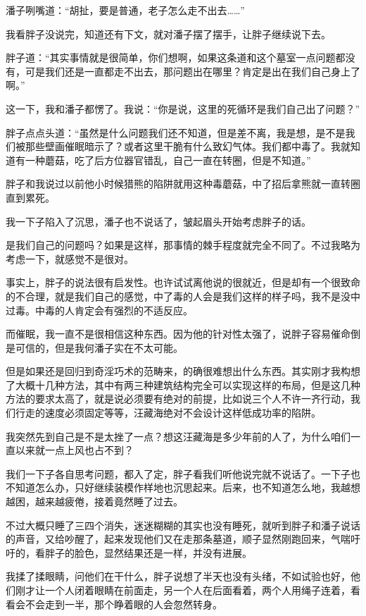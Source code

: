 潘子咧嘴道：“胡扯，要是普通，老子怎么走不出去……”

我看胖子没说完，知道还有下文，就对潘子摆了摆手，让胖子继续说下去。

胖子道：“其实事情就是很简单，你们想啊，如果这条道和这个墓室一点问题都没有，可是我们还是一直都走不出去，那问题出在哪里？肯定是出在我们自己身上了啊。”

这一下，我和潘子都愣了。我说：“你是说，这里的死循环是我们自己出了问题？”

胖子点点头道：“虽然是什么问题我们还不知道，但是差不离，我是想，是不是我们被那些壁画催眠暗示了？或者这里干脆有什么致幻气体。我们都中毒了。我就知道有一种蘑菇，吃了后方位器官错乱，自己一直在转圈，但是不知道。”

胖子和我说过以前他小时候猎熊的陷阱就用这种毒蘑菇，中了招后拿熊就一直转圈直到累死。

我一下子陷入了沉思，潘子也不说话了，皱起眉头开始考虑胖子的话。

是我们自己的问题吗？如果是这样，那事情的棘手程度就完全不同了。不过我略为考虑一下，就感觉不是很对。

事实上，胖子的说法很有启发性。也许试试离他说的很就近，但是却有一个很致命的不合理，就是我们自己的感觉，中了毒的人会是我们这样的样子吗，我不是没中过毒。中毒的人肯定会有强烈的不适反应。

而催眠，我一直不是很相信这种东西。因为他的针对性太强了，说胖子容易催命倒是可信的，但是我何潘子实在不太可能。

但是如果还是回归到奇淫巧术的范畴来，的确很难想出什么东西。其实刚才我构想了大概十几种方法，其中有两三种建筑结构完全可以实现这样的布局，但是这几种方法的要求太高了，就是说必须要有绝对的前提，比如说三个人不许一齐行动，我们行走的速度必须固定等等，汪藏海绝对不会设计这样低成功率的陷阱。

我突然先到自己是不是太挫了一点？想这汪藏海是多少年前的人了，为什么咱们一直以来就一点上风也占不到？

我们一下子各自思考问题，都入了定，胖子看我们听他说完就不说话了。一下子也不知道怎么办，只好继续装模作样地也沉思起来。后来，也不知道怎么地，我越想越困，越来越疲倦，接着竟然睡了过去。

不过大概只睡了三四个消失，迷迷糊糊的其实也没有睡死，就听到胖子和潘子说话的声音，又给吵醒了，起来发现他们又在走那条墓道，顺子显然刚跑回来，气喘吁吁的，看胖子的脸色，显然结果还是一样，并没有进展。

我揉了揉眼睛，问他们在干什么，胖子说想了半天也没有头绪，不如试验也好，他们刚才让一个人闭着眼睛在前面走，另一个人在后面看着，两个人用绳子连着，看看会不会走到一半，那个睁着眼的人会忽然转身。

